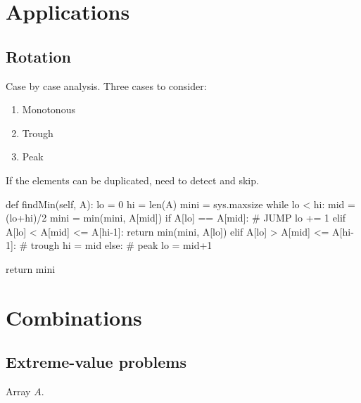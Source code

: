 \section{Applications}
\subsection{Rotation}
 Case by case analysis. Three cases to consider:
\begin{enumerate}
\item Monotonous 
\item Trough 
\item Peak
\end{enumerate}

If the elements can be duplicated, need to detect and skip. 
\begin{python}
def findMin(self, A):
    lo = 0
    hi = len(A)
    mini = sys.maxsize
    while lo < hi:
        mid = (lo+hi)/2
        mini = min(mini, A[mid])
        if A[lo] == A[mid]:  # JUMP
            lo += 1
        elif A[lo] < A[mid] <= A[hi-1]:
            return min(mini, A[lo])
        elif A[lo] > A[mid] <= A[hi-1]:  # trough
            hi = mid
        else:  # peak
            lo = mid+1

    return mini
\end{python}
\section{Combinations}
\subsection{Extreme-value problems}\label{extremeValueProblem}
 Array $A$.

